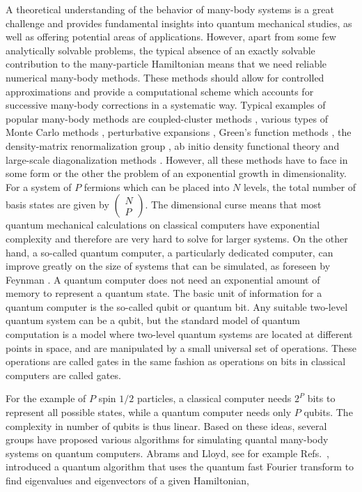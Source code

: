 \documentclass[10pt]{article}
\begin{document}
A theoretical understanding of the behavior of many-body systems
is a  great challenge and provides fundamental insights into quantum 
mechanical studies, as well
as offering potential areas of applications.
However, apart from some few analytically solvable problems,
the typical absence of an exactly solvable contribution to the
many-particle
 Hamiltonian
means that we need reliable numerical many-body methods.
These methods should allow for controlled approximations
and provide a computational scheme which accounts for successive
many-body corrections in a systematic way.
Typical examples of
popular many-body methods are coupled-cluster methods
\cite{bartlett81,helgaker,Dean2004},
various types of
Monte Carlo methods \cite{Pudliner1997,kdl97,ceperley1995},
perturbative expansions \cite{lindgren,mhj95},
Green's function methods \cite{dickhoff,blaizot},
the density-matrix renormalization group \cite{white1992,schollwock2005},
ab initio density functional theory
\cite{bartlett2005,peirs2003,vanneck2006}
and large-scale diagonalization methods
\cite{Whitehead1977,caurier2005,navratil2004,horoi2006}. 
However, all these methods have to face in some form or the other the problem of 
an exponential growth in dimensionality. For a system of $P$ fermions
which 
can be placed 
into $N$ levels, the total number of basis states are given by
$\left(\begin{array}{c}N\\P\end{array}\right)$.
The dimensional curse means that most quantum
mechanical calculations on classical computers have exponential
complexity and therefore are very hard to solve for larger systems. On 
the other hand, a so-called 
quantum computer, a particularly dedicated computer,
can improve greatly on the size of systems that can be simulated, as
foreseen by Feynman \cite{feynman1982,feynman1986}. A quantum computer 
does not need
an exponential amount of memory to represent a quantum state.  
The basic unit of information for a  quantum computer 
is the so-called qubit or quantum bit. Any
suitable 
two-level quantum system can be a qubit, but the  
standard model of quantum computation is a model where two-level
quantum systems are located at different points in
space, and are manipulated by a small universal set of  operations.
These operations are called gates in the same fashion as operations on
bits in classical computers are called gates. 

For the example of $P$ spin $1/2$  particles, 
a classical computer needs $2^P$ bits to represent all possible states, while  
a quantum computer needs only $P$ qubits. The complexity in
number of qubits is thus linear.  Based on these ideas, several groups have proposed
various algorithms for simulating quantal many-body systems on quantum computers.
Abrams 
and  Lloyd, see for example Refs.~\cite{lloyd1997,lloyd1999a}, introduced a  
quantum algorithm that uses the quantum fast Fourier transform to find 
eigenvalues and eigenvectors of a given Hamiltonian,
\end{document}

